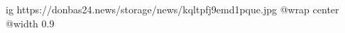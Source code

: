 
 
 
 
 

\ifcmt
  ig https://donbas24.news/storage/news/kqltpfj9emd1pque.jpg
  @wrap center
  @width 0.9
\fi
